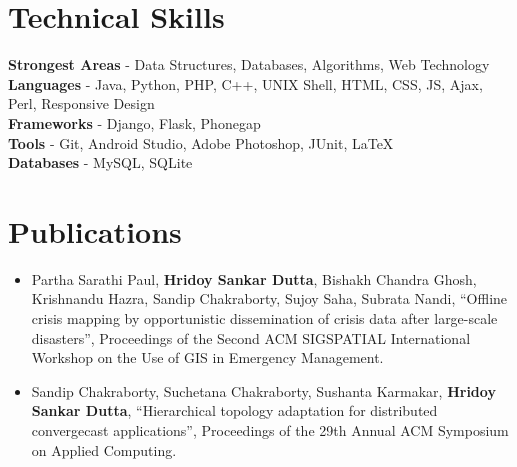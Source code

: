 \documentclass[margin, centered]{res}
\begin{document}
\begin{resume}
\section{Technical \hspace{2mm} Skills}
\textbf{Strongest Areas} - Data Structures, Databases, Algorithms, Web Technology \\
\textbf{Languages} - Java, Python,  PHP, C++, UNIX Shell, HTML, CSS, JS, Ajax, Perl, Responsive Design \\
\textbf{Frameworks} - Django, Flask, Phonegap \\
\textbf{Tools} - Git, Android Studio, Adobe Photoshop, JUnit, \LaTeX \\
\textbf{Databases} - MySQL, SQLite \\


\section{Publications}
\begin{itemize}[leftmargin=*]
\item Partha Sarathi Paul, \textbf{Hridoy Sankar Dutta}, Bishakh Chandra Ghosh, Krishnandu Hazra, Sandip Chakraborty, Sujoy Saha, Subrata Nandi, ``Offline crisis mapping by opportunistic dissemination of crisis data after large-scale disasters'', Proceedings of the Second ACM SIGSPATIAL International Workshop on the Use of GIS in Emergency Management.
\item Sandip Chakraborty, Suchetana Chakraborty, Sushanta Karmakar, \textbf{Hridoy Sankar Dutta}, ``Hierarchical topology adaptation for distributed convergecast applications'', Proceedings of the 29th Annual ACM Symposium on Applied Computing.
\end{itemize}


\end{resume}
\end{document}

